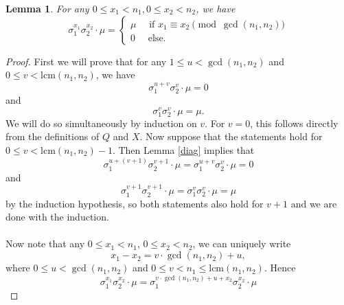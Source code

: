 \documentclass[12pt,a4paper]{article}
\newtheorem{lemma}[theorem]{Lemma}
\theoremstyle{definition}
\newcommand{\lcm}{\mathrm{lcm}}
\begin{document}
\begin{lemma}\label{M0}
For any $0\leq x_1<n_1, 0\leq x_2<n_2$, we have $$\sigma_1^{x_1}\sigma_2^{x_2}\cdot \mu=\begin{cases}
\mu \quad \text{ if } x_1\equiv x_2 \pmod{\gcd(n_1,n_2)}\\
0 \quad \text{ else}.
\end{cases}$$
\end{lemma}
\begin{proof}
First we will prove that for any $1\leq u<\gcd(n_1,n_2)$ and $0\leq v<\lcm(n_1,n_2)$, we have $$\sigma_1^{u+v}\sigma_2^{v}\cdot \mu=0$$
and $$\sigma_1^{v}\sigma_2^{v}\cdot \mu=\mu.$$
We will do so simultaneously by induction on $v$. For $v=0$, this follows directly from the definitions of $Q$ and $X$. Now suppose that the statements hold for $0\leq v<\lcm(n_1,n_2)-1$. Then Lemma \ref{diag} implies that $$\sigma_1^{u+(v+1)}\sigma_2^{v+1}\cdot \mu=\sigma_1^{u+v}\sigma_2^{v}\cdot \mu=0$$
and $$\sigma_1^{v+1}\sigma_2^{v+1}\cdot \mu=\sigma_1^{v}\sigma_2^{v}\cdot \mu=\mu$$
by the induction hypothesis, so both statements also hold for $v+1$ and we are done with the induction.

\paragraph*{}
Now note that any $0\leq x_1<n_1$, $0\leq x_2<n_2$, we can uniquely write $$x_1-x_2=v\cdot \gcd(n_1,n_2)+u,$$ where $0\leq u<\gcd(n_1,n_2)$ and $0\leq v<n_1\leq \lcm(n_1,n_2)$. Hence $$\sigma_1^{x_1}\sigma_2^{x_2}\cdot\mu=\sigma_1^{v\cdot \gcd(n_1,n_2)+u+x_2}\sigma_2^{x_2}\cdot\mu$$
\end{proof}
\end{document}
